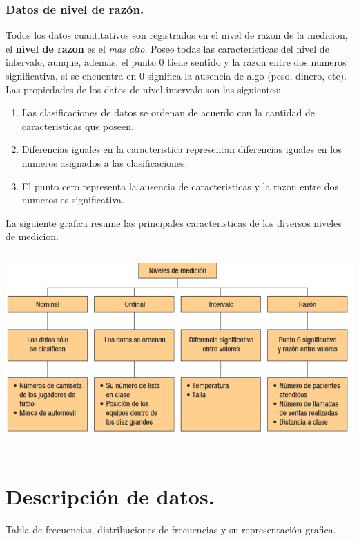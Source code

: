 \documentclass[]{article}
\begin{document}
\subsubsection*{Datos de nivel de razón.}
Todos los datos cuantitativos son registrados en el nivel de razon de la medicion, el \textbf{nivel de razon} es el \textit{mas alto}. Posee todas las caracteristicas del nivel de intervalo, aunque, ademas, el punto 0 tiene sentido y la razon entre dos numeros significativa, si se encuentra en 0 significa la ausencia de algo (peso, dinero, etc). Las propiedades de los datos de nivel intervalo son las siguientes:
\begin{enumerate}
	\item Las clasificaciones de datos se ordenan de acuerdo con la cantidad de caracteristicas que poseen.
	\item Diferencias iguales en la caracteristica representan diferencias iguales en los numeros asignados a las clasificaciones.
	\item El punto cero representa la ausencia de caracteristicas y la razon entre dos numeros es significativa.
\end{enumerate}
La siguiente grafica resume las principales caracteristicas de los diversos niveles de medicion.
\\
\includegraphics[width=16cm, height=8cm]{resumenCaracteristicasNivelesMedicion1_3}
\section{Descripción de datos.}
{\large Tabla de frecuencias, distribuciones de frecuencias y su representación grafica.}
\end{document}
